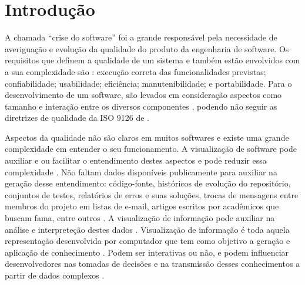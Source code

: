 \chapter{Introdução}


A chamada ``crise do software'' \cite{arthur1985measuring} foi a grande
responsável pela necessidade de averiguação e evolução da qualidade do produto
da engenharia de software. Os requisitos que definem a qualidade de um sistema
e também estão envolvidos com a sua complexidade são
\cite{behkamal2009customizing}: execução correta das funcionalidades previstas;
confiabilidade; usabilidade; eficiência; manutenibilidade; e portabilidade. Para
o desenvolvimento de um software, são levados em consideração aspectos como
tamanho e interação entre os diversos componentes \cite{koscianski2007qualidade},
podendo não seguir as diretrizes de qualidade da ISO 9126 de
.

Aspectos da qualidade não são claros em muitos softwares e existe
uma grande complexidade em entender o seu funcionamento. A visualização de
software pode auxiliar e ou facilitar o entendimento destes aspectos e pode
reduzir essa complexidade \cite{messias2012} \cite{benkler2006wealth}. Não
faltam dados disponíveis publicamente para auxiliar na geração desse
entendimento: código-fonte, históricos de evolução do repositório, conjuntos de
testes, relatórios de erros e suas soluções, trocas de mensagens entre membros
do projeto em listas de e-mail, artigos escritos por acadêmicos que buscam fama,
entre outros \cite{messias2012} \cite{benkler2006wealth}. A visualização de
informação pode auxiliar na análise e interpreteção destes dados
\cite{messias2012}. Visualização de informação é toda aquela representação
desenvolvida por computador que tem como objetivo a geração e aplicação de
conhecimento \cite{card1999readings}. Podem ser interativas ou não, e podem
influenciar desenvolvedores nas tomadas de decisões e na transmissão desses
conhecimentos a partir de dados complexos \cite{card1999readings}.


